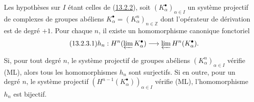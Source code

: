 \begin{proposition}[13.2.3]
\label{0.13.2.3-fr}
Les hypothèses sur $I$ étant celles de
\textup{(\hyperref[0.13.2.2-fr]{13.2.2})}, soit
$(K_\alpha^\bullet)_{\alpha\in I}$ un système projectif de complexes de
groupes abéliens
$K_\alpha^\bullet=(K_\alpha^n)_{n\in\mathbb Z}$ dont l'opérateur de
dérivation est de degré $+1$. Pour chaque $n$, il existe un homomorphisme
canonique fonctoriel
\begin{equation}
\label{0.13.2.3.1-fr}
\tag{13.2.3.1}
h_n:H^n(\varprojlim K_\alpha^\bullet)
\longrightarrow\varprojlim H^n(K_\alpha^\bullet).
\end{equation}

Si, pour tout degré $n$, le système projectif de groupes abéliens
$(K_\alpha^n)_{\alpha\in I}$ vérifie \textup{(ML)}, alors tous les homomorphismes
$h_n$ sont surjectifs. Si en outre, pour un degré $n$, le système
projectif $(H^{n-1}(K_\alpha^\bullet))_{\alpha\in I}$ vérifie \textup{(ML)},
l'homomorphisme $h_n$ est bijectif.
\end{proposition}

